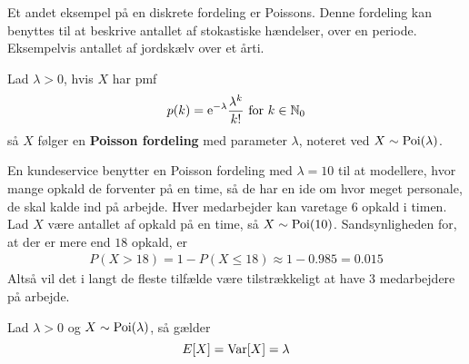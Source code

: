 Et andet eksempel på en diskrete fordeling er Poissons. Denne fordeling kan benyttes til at beskrive antallet af stokastiske hændelser, over en periode. Eksempelvis antallet af jordskælv over et årti.
\begin{defn}\label{def:poisson}
    Lad $\lambda>0$, hvis $X$ har pmf
    \begin{align*}
         p(k)=\mathrm{e}^{-\lambda}\frac{\lambda^k}{k!}\text{ for } k\in\mathbb{N}_0
    \end{align*}
    så $X$ følger en \textbf{Poisson fordeling} med parameter $\lambda$, noteret ved $X\sim\textnormal{Poi}(\lambda)$.
\end{defn}

\begin{exmp}\label{exmp:kundeservice}
En kundeservice benytter en Poisson fordeling med $\lambda = 10$ til at modellere, hvor mange opkald de forventer på en time, så de har en ide om hvor meget personale, de skal kalde ind på arbejde. Hver medarbejder kan varetage $6$ opkald i timen. Lad $X$ være antallet af opkald på en time, så $X \sim \textnormal{Poi}(10)$.
Sandsynligheden for, at der er mere end $18$ opkald, er
\begin{align*}
    P(X > 18) = 1 - P(X \leq 18) \approx 1 - 0.985 = 0.015
\end{align*}
Altså vil det i langt de fleste tilfælde være tilstrækkeligt at have 3 medarbejdere på arbejde. 
\end{exmp}
\begin{prop}\label{prop:poiForventedOgVarians} %
Lad $\lambda > 0$ og $X \sim \textnormal{Poi}(\lambda)$, så gælder
\begin{equation*}
    E[X] = \textnormal{Var}[X] = \lambda
\end{equation*}
\end{prop}
